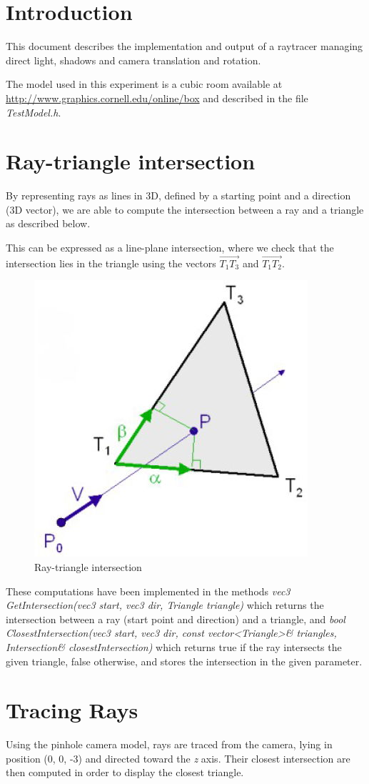 \section*{Introduction}
This document describes the implementation and output of a raytracer managing direct light, shadows and camera translation and rotation.

The model used in this experiment is a cubic room available at \url{http://www.graphics.cornell.edu/online/box} and described in the file \textit{TestModel.h}.

\setcounter{section}{0} 

\section{Ray-triangle intersection}
By representing rays as lines in 3D, defined by a starting point and a direction (3D vector), we are able to compute the intersection between a ray and a triangle as described below.

This can be expressed as a line-plane intersection, where we check that the intersection lies in the triangle using the vectors $\vec{T_1T_3}$ and $\vec{T_1T_2}$.

\begin{figure}[H]
\centering
\includegraphics[width=0.2\linewidth]{img/ray.jpg}
\caption{Ray-triangle intersection}
\end{figure}

These computations have been implemented in the methods \textit{vec3 GetIntersection(vec3 start, vec3 dir, Triangle triangle)} which returns the intersection between a ray (start point and direction) and a triangle, and
\textit{bool ClosestIntersection(vec3 start, vec3 dir, const vector<Triangle>\& triangles, Intersection\& closestIntersection)} which returns true if the ray intersects the given triangle, false otherwise, and stores the intersection in the given parameter.

\section{Tracing Rays}
Using the pinhole camera model, rays are traced from the camera, lying in position (0, 0, -3) and directed toward the \textit{z} axis. Their closest intersection are then computed in order to display the closest triangle.

